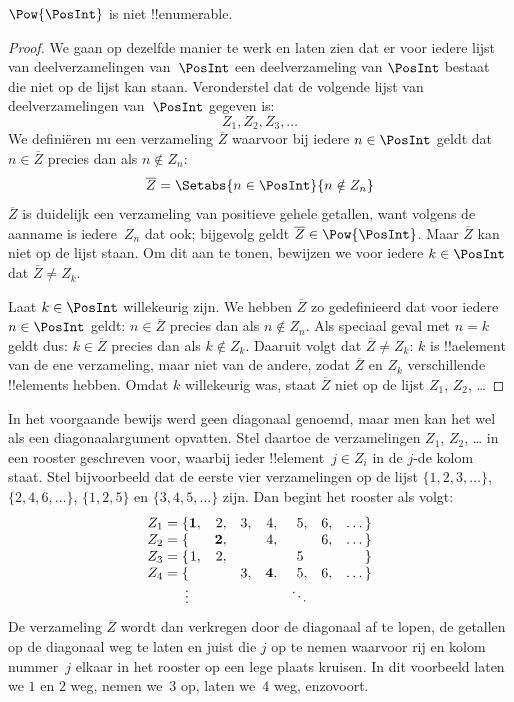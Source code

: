 \documentclass[../../../include/open-logic-section]{subfiles}
\begin{document}
\begin{thm}
$\Pow{\PosInt}$ is niet !!{enumerable}.
\end{thm}

\begin{proof}
We gaan op dezelfde manier te werk en laten zien dat er voor iedere
lijst van deelverzamelingen van~$\PosInt$ een deelverzameling van
$\PosInt$ bestaat die niet op de lijst kan staan. Veronderstel dat de
volgende lijst van deelverzamelingen van~$\PosInt$ gegeven is:
\[
Z_{1}, Z_{2}, Z_{3}, \dots
\]
We definiëren nu een verzameling $\overline{Z}$ waarvoor bij iedere
$n \in \PosInt$ geldt dat $n \in \overline{Z}$ precies dan als $n
\notin Z_{n}$:
\[
\overline{Z} = \Setabs{n \in \PosInt}{n \notin Z_n}
\]
$\overline{Z}$ is duidelijk een verzameling van positieve gehele
getallen, want volgens de aanname is iedere~$Z_n$ dat ook; bijgevolg
geldt $\overline{Z} \in \Pow{\PosInt}$. Maar $\overline{Z}$ kan niet op
de lijst staan. Om dit aan te tonen, bewijzen we voor iedere $k \in
\PosInt$ dat $\overline{Z} \neq Z_k$.

Laat $k \in \PosInt$ willekeurig zijn. We hebben $\overline{Z}$ zo
gedefinieerd dat voor iedere $n \in \PosInt$ geldt: $n \in
\overline{Z}$ precies dan als $n \notin Z_n$. Als speciaal geval met
$n=k$ geldt dus: $k \in \overline{Z}$ precies dan als $k \notin Z_k$.
Daaruit volgt dat $\overline{Z} \neq Z_k$: $k$ is !!a{element} van de
ene verzameling, maar niet van de andere, zodat $\overline{Z}$ en $Z_k$
verschillende !!{element}s hebben. Omdat $k$ willekeurig was, staat
$\overline{Z}$ niet op de lijst $Z_1$, $Z_2$, \dots
\end{proof}

\begin{explain}
In het voorgaande bewijs werd geen diagonaal genoemd, maar men kan het
wel als een diagonaalargument opvatten. Stel daartoe de verzamelingen
$Z_1$, $Z_2$, \dots{} in een rooster geschreven voor, waarbij ieder
!!{element}~$j \in Z_i$ in de $j$-de kolom staat. Stel bijvoorbeeld dat
de eerste vier verzamelingen op de lijst $\{1,2,3,\dots\}$, $\{2, 4, 6,
\dots\}$, $\{1,2,5\}$ en $\{3,4,5,\dots\}$ zijn. Dan begint het rooster
als volgt:
\[
\begin{array}{r@{}rrrrrrr}
  Z_1 = \{ & \mathbf{1}, & 2, & 3, & 4, & 5, & 6, & \dots\}\\
  Z_2 = \{ &  & \mathbf{2}, &  & 4, &  & 6, & \dots\}\\
  Z_3 = \{ & 1, & 2, &  &  & 5\phantom{,} &  & \}\\
  Z_4 = \{ &  &  & 3, & \mathbf{4}, & 5, & 6, & \dots\}\\
  \vdots & & & & & \ddots
\end{array}
\]
De verzameling $\overline{Z}$ wordt dan verkregen door de diagonaal af
te lopen, de getallen op de diagonaal weg te laten en juist die $j$ op
te nemen waarvoor rij en kolom nummer~$j$ elkaar in het rooster op een
lege plaats kruisen. In dit voorbeeld laten we $1$ en $2$ weg, nemen
we~$3$ op, laten we~$4$ weg, enzovoort.
\end{explain}
\end{document}
